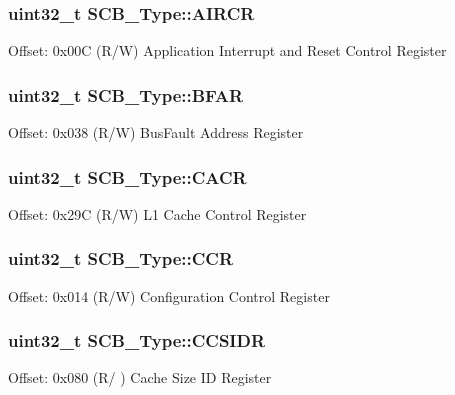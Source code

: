 \subsubsection[{\texorpdfstring{A\+I\+R\+CR}{AIRCR}}]{ uint32\+\_\+t S\+C\+B\+\_\+\+Type\+::\+A\+I\+R\+CR}\hypertarget{struct_s_c_b___type_a6ed3c9064013343ea9fd0a73a734f29d}{}\label{struct_s_c_b___type_a6ed3c9064013343ea9fd0a73a734f29d}
Offset\+: 0x00C (R/W) Application Interrupt and Reset Control Register 
\subsubsection[{\texorpdfstring{B\+F\+AR}{BFAR}}]{ uint32\+\_\+t S\+C\+B\+\_\+\+Type\+::\+B\+F\+AR}\hypertarget{struct_s_c_b___type_a31f79afe86c949c9862e7d5fce077c3a}{}\label{struct_s_c_b___type_a31f79afe86c949c9862e7d5fce077c3a}
Offset\+: 0x038 (R/W) Bus\+Fault Address Register 
\subsubsection[{\texorpdfstring{C\+A\+CR}{CACR}}]{ uint32\+\_\+t S\+C\+B\+\_\+\+Type\+::\+C\+A\+CR}\hypertarget{struct_s_c_b___type_acc2c89b1b03bed0224952b05582ce397}{}\label{struct_s_c_b___type_acc2c89b1b03bed0224952b05582ce397}
Offset\+: 0x29C (R/W) L1 Cache Control Register 
\subsubsection[{\texorpdfstring{C\+CR}{CCR}}]{ uint32\+\_\+t S\+C\+B\+\_\+\+Type\+::\+C\+CR}\hypertarget{struct_s_c_b___type_a6d273c6b90bad15c91dfbbad0f6e92d8}{}\label{struct_s_c_b___type_a6d273c6b90bad15c91dfbbad0f6e92d8}
Offset\+: 0x014 (R/W) Configuration Control Register 
\subsubsection[{\texorpdfstring{C\+C\+S\+I\+DR}{CCSIDR}}]{ uint32\+\_\+t S\+C\+B\+\_\+\+Type\+::\+C\+C\+S\+I\+DR}\hypertarget{struct_s_c_b___type_a5b8ace34dde093049c26c56c9e3819cc}{}\label{struct_s_c_b___type_a5b8ace34dde093049c26c56c9e3819cc}
Offset\+: 0x080 (R/ ) Cache Size ID Register 
